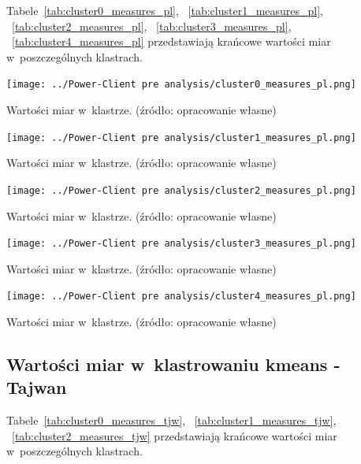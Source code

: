 \documentclass[11pt]{report}
\begin{document}
    Tabele~\ref{tab:cluster0_measures_pl},
    ~\ref{tab:cluster1_measures_pl},
    ~\ref{tab:cluster2_measures_pl},
    ~\ref{tab:cluster3_measures_pl},
    ~\ref{tab:cluster4_measures_pl}
    przedstawiają krańcowe wartości miar w~poszczególnych klastrach.

    \begin{table}[tp]
        \centering
        \texttt{[image: ../Power-Client pre analysis/cluster0\_measures\_pl.png]}
        \caption{Wartości miar w~klastrze. (źródło: opracowanie własne)}
        \label{tab:cluster0_measures_pl}
    \end{table}

    \begin{table}[tp]
        \centering
        \texttt{[image: ../Power-Client pre analysis/cluster1\_measures\_pl.png]}
        \caption{Wartości miar w~klastrze. (źródło: opracowanie własne)}
        \label{tab:cluster1_measures_pl}
    \end{table}

    \begin{table}[tp]
        \centering
        \texttt{[image: ../Power-Client pre analysis/cluster2\_measures\_pl.png]}
        \caption{Wartości miar w~klastrze. (źródło: opracowanie własne)}
        \label{tab:cluster2_measures_pl}
    \end{table}

    \begin{table}[tp]
        \centering
        \texttt{[image: ../Power-Client pre analysis/cluster3\_measures\_pl.png]}
        \caption{Wartości miar w~klastrze. (źródło: opracowanie własne)}
        \label{tab:cluster3_measures_pl}
    \end{table}

    \begin{table}[tp]
        \centering
        \texttt{[image: ../Power-Client pre analysis/cluster4\_measures\_pl.png]}
        \caption{Wartości miar w~klastrze. (źródło: opracowanie własne)}
        \label{tab:cluster4_measures_pl}
    \end{table}

    \subsection{Wartości miar w~klastrowaniu kmeans - Tajwan}\label{subsec:wartości-miar-w-klastrowaniu-kmeans---tajwan}

    Tabele~\ref{tab:cluster0_measures_tjw},
    ~\ref{tab:cluster1_measures_tjw},
    ~\ref{tab:cluster2_measures_tjw}
    przedstawiają krańcowe wartości miar w~poszczególnych klastrach.
\end{document}
